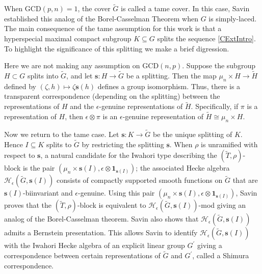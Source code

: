 \documentclass[10pt, letterpaper]{amsart}
\theoremstyle{plain}
\theoremstyle{definition}
\numberwithin{equation}{section}
\newcommand{\Gt}{\widetilde{G}}
\newcommand{\Ht}{\widetilde{H}}
\newcommand{\Tt}{\widetilde{T}}
\newcommand{\s}{\mathbf{s}}
\newcommand{\Hcal}{\mathcal{H}}
\newcommand{\one}{\mathbf{1}}
\begin{document}
When $\mathrm{GCD}(p,n)=1$, the cover $\Gt$ is called a tame cover. In this case, Savin \cite{S04} established this analog of the Borel-Casselman Theorem when $G$ is simply-laced. The main consequence of the tame assumption for this work is that a hyperspecial maximal compact subgroup $K\subseteq G$ splits the sequence \eqref{CExtIntro}. To highlight the significance of this splitting we make a brief digression. 

Here we are not making any assumption on $\mathrm{GCD}(n,p)$. Suppose the subgroup $H\subset G$ splits into $\Gt$, and let $\s :H\rightarrow \Gt$ be a splitting. Then the map $\mu_{n}\times H\rightarrow \Ht$ defined by $(\zeta,h)\mapsto \zeta\s(h)$ defines a group isomorphism. Thus, there is a transparent correspondence (depending on the splitting) between the representations of $H$ and the $\epsilon$-genuine representations of $\Ht$. Specifically, if $\pi$ is a representation of $H$, then $\epsilon\otimes \pi$ is an $\epsilon$-genuine representation of $\Ht\cong \mu_{n}\times H$.


Now we return to the tame case. Let $\s:K\rightarrow \Gt$ be the unique splitting of $K$. Hence $I\subseteq K$ splits to $\Gt$ by restricting the splitting $\s$. When $\rho$ is unramified with respect to $\mathbf{s}$, a natural candidate for the Iwahori type describing the $(\Tt,\rho)$-block is the pair $(\mu_{n}\times \s(I),\epsilon \otimes \one_{\s(I)})$; the associated Hecke algebra $\Hcal_{\epsilon}(\Gt, \s(I))$ consists of compactly supported smooth functions on $\Gt$ that are $\s(I)$-biinvariant and $\epsilon$-genuine. Using this pair $(\mu_{n}\times \s(I),\epsilon \otimes \one_{\s(I)})$, Savin proves that the $(\Tt,\rho)$-block is equivalent to $\Hcal_{\epsilon}(\Gt, \s(I))$-mod giving an analog of the Borel-Casselman theorem. Savin also shows that $\Hcal_{\epsilon}(\Gt, \s(I))$ admits a Bernstein presentation. This allows Savin to identify $\Hcal_{\epsilon}(\Gt, \s(I))$ with the Iwahori Hecke algebra of an explicit linear group $G^{\prime}$ giving a correspondence between certain representations of $\Gt$ and $G^{\prime}$, called a Shimura correspondence.
\end{document}
